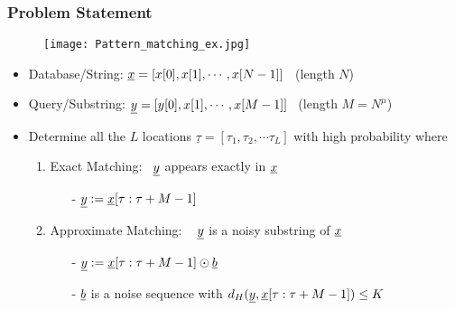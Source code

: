 
 \begin{frame}\frametitle{Problem Statement}
 	\vspace{-0.4cm}
	\begin{figure}[t]
		\centering
		\texttt{[image: Pattern\_matching\_ex.jpg]}
	\end{figure}
	\vspace{-12pt}
	\begin{block}{}
\begin{itemize}\itemsep3pt
	\item {\color{blue} Database/String}: $\underline{x} = [x[0], x[1], \cdots, x[N-1]]$ \ (length $N$)
	\item { \color{blue} Query/Substring}: $\underline{y} = [y[0], x[1], \cdots, x[M-1]]$ \ (length $M = N^\mu$) \vspace{2pt}
	\item Determine all the {\color{blue} $L$ locations} $\underline{\tau} = [\tau_1, \tau_2, \cdots \tau_L]$ with  {\color{blue}high probability}  where\\
	\begin{enumerate}
		\item \normalsize \alert{Exact Matching}:~  $\underline{y}$ appears {\color{blue}exactly} in $\underline{x}$
		\begin{itemize}\normalsize
				\item [-]  $\underline{y} := \underline{x}[\tau:\tau+M-1]$
		\end{itemize}  
		\item \normalsize \alert{Approximate Matching:} ~ $\underline{y}$ is a {\color{blue}noisy substring} of $\underline{x}$
		
		\begin{itemize}\itemsep5pt \normalsize
				\item [-] $\underline{y} := \underline{x}[\tau:\tau+M-1] \odot \underline{b}$ 
				\item [-] $\underline{b}$ is a noise sequence with $d_H(\underline{y},\underline{x}[\tau:\tau+M-1]) \leq K$   
		\end{itemize}
	\end{enumerate}   
\end{itemize}

	\end{block}
	 \end{frame} 
	 
